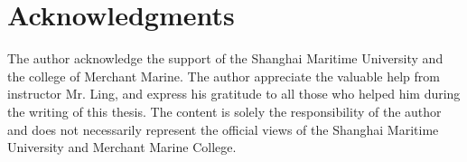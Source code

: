 \documentclass[a4paper]{article}
\renewcommand{\Large}{\fontsize{12pt}{\baselineskip}\selectfont}
\begin{document}
\section*{ \Large Acknowledgments}
The author acknowledge the support of the Shanghai Maritime
University and the college of Merchant Marine. The author appreciate the valuable
help from instructor Mr. Ling, and express his gratitude to all those who helped him
during the writing of this thesis. The content is solely the responsibility of the author and
does not necessarily represent the official views of the Shanghai Maritime University
and Merchant Marine College.
\end{document}
